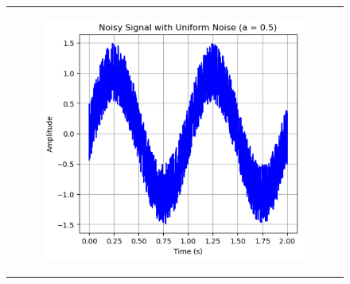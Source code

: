 \documentclass[hidelinks,12pt]{article}
\begin{document}
\begin{figure}[!h]
\begin{tabular}{c}
\begin{subfigure}[h]{0.3\textwidth}
			\end{subfigure}
			\hfill
			\begin{subfigure}[h]{0.3\textwidth}
				\centering
				\includegraphics[width=\textwidth]{figures/uniform_noise/0.5.png}
			\end{subfigure} \\
			

\end{tabular}
\end{figure}
\end{document}
